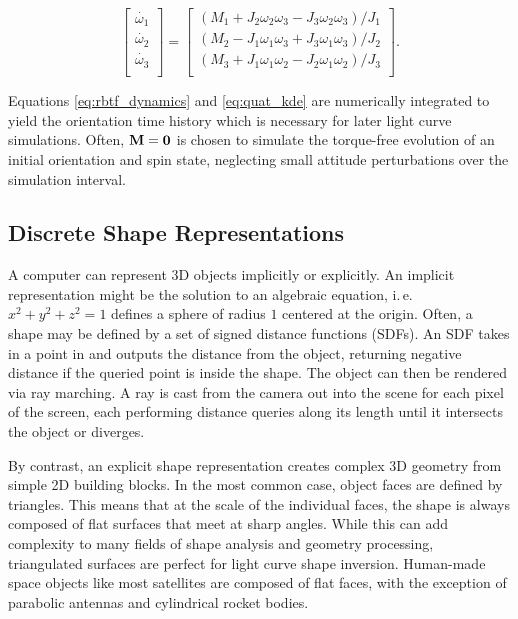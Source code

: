\begin{equation} \label{eq:rbtf_dynamics}
    \left[\begin{matrix}\dot{\omega_1}\\\dot{\omega_2}\\\dot{\omega_3}\\\end{matrix}\right]
    =
    \left[\begin{matrix}
        \left(M_1+J_2\omega_2\omega_3-J_3\omega_2\omega_3\right) / J_1 \\
        \left(M_2-J_1\omega_1\omega_3+J_3\omega_1\omega_3\right) / J_2 \\
        \left(M_3+J_1\omega_1\omega_2-J_2\omega_1\omega_2\right) / J_3 \\
    \end{matrix}\right].
\end{equation}

Equations \ref{eq:rbtf_dynamics} and \ref{eq:quat_kde} are numerically integrated to yield the orientation time history which is necessary for later light curve simulations. Often, $\mathbf{M} = \mathbf{0}$ is chosen to simulate the torque-free evolution of an initial orientation and spin state, neglecting small attitude perturbations over the simulation interval.

\subsection{Discrete Shape Representations}

A computer can represent 3D objects implicitly or explicitly. An implicit representation might be the solution to an algebraic equation, i.\,e.\, $x^2 + y^2 + z^2 = 1$ defines a sphere of radius $1$ centered at the origin. Often, a shape may be defined by a set of signed distance functions (SDFs). An SDF takes in a point in \rthree and outputs the distance from the object, returning negative distance if the queried point is inside the shape. The object can then be rendered via ray marching. A ray is cast from the camera out into the scene for each pixel of the screen, each performing distance queries along its length until it intersects the object or diverges. 

By contrast, an explicit shape representation creates complex 3D geometry from simple 2D building blocks. In the most common case, object faces are defined by triangles. This means that at the scale of the individual faces, the shape is always composed of flat surfaces that meet at sharp angles. While this can add complexity to many fields of shape analysis and geometry processing, triangulated surfaces are perfect for light curve shape inversion. Human-made space objects like most satellites are composed of flat faces, with the exception of parabolic antennas and cylindrical rocket bodies.

